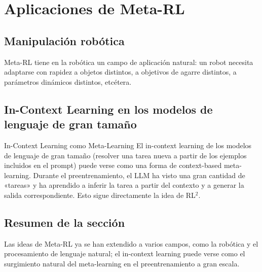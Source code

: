 \section{Aplicaciones de Meta-RL}

\subsection{Manipulación robótica}

Meta-RL tiene en la robótica un campo de aplicación natural: un robot necesita adaptarse con rapidez a objetos distintos, a objetivos de agarre distintos, a parámetros dinámicos distintos, etcétera.

\subsection{In-Context Learning en los modelos de lenguaje de gran tamaño}

\begin{knowledgebox}{In-Context Learning como Meta-Learning}
El in-context learning de los modelos de lenguaje de gran tamaño (resolver una tarea nueva a partir de los ejemplos incluidos en el prompt) puede verse como una forma de context-based meta-learning. Durante el preentrenamiento, el LLM ha visto una gran cantidad de «tareas» y ha aprendido a inferir la tarea a partir del contexto y a generar la salida correspondiente. Esto sigue directamente la idea de RL$^2$.
\end{knowledgebox}

\subsection{Resumen de la sección}

Las ideas de Meta-RL ya se han extendido a varios campos, como la robótica y el procesamiento de lenguaje natural; el in-context learning puede verse como el surgimiento natural del meta-learning en el preentrenamiento a gran escala.
